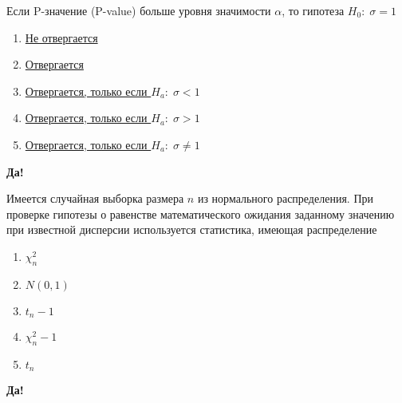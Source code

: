 \documentclass[t]{beamer}
\begin{document}
 \begin{frame} \label{9-Yes} 
\begin{block}{9} 

Если P-значение (P-value) больше уровня значимости  $\alpha$, то гипотеза  $H_0: \; \sigma=1$
 


 \end{block} 
\begin{enumerate} 
\item[] \hyperlink{9-Yes}{\beamergotobutton{} Не отвергается}
\item[] \hyperlink{9-No}{\beamergotobutton{} Отвергается}
\item[] \hyperlink{9-No}{\beamergotobutton{} Отвергается, только если  $H_a: \; \sigma<1$}
\item[] \hyperlink{9-No}{\beamergotobutton{} Отвергается, только если  $H_a: \; \sigma>1$}
\item[] \hyperlink{9-No}{\beamergotobutton{} Отвергается, только если  $H_a: \; \sigma\neq 1$}
\end{enumerate} 

 \textbf{Да!} 
 \hyperlink{10}{}\end{frame} 


 \begin{frame} \label{10-Yes} 
\begin{block}{10} 

Имеется случайная выборка размера $n$ из нормального распределения. При проверке гипотезы о равенстве математического ожидания заданному значению при известной дисперсии используется статистика, имеющая распределение
 


 \end{block} 
\begin{enumerate} 
\item[] \hyperlink{10-No}{\beamergotobutton{} $\chi^2_n$}
\item[] \hyperlink{10-Yes}{\beamergotobutton{} $N(0,1)$}
\item[] \hyperlink{10-No}{\beamergotobutton{} $t_n-1$}
\item[] \hyperlink{10-No}{\beamergotobutton{} $\chi^2_n-1$}
\item[] \hyperlink{10-No}{\beamergotobutton{} $t_n$}
\end{enumerate} 

 \textbf{Да!} 
 \hyperlink{11}{}\end{frame} 
\end{document}
